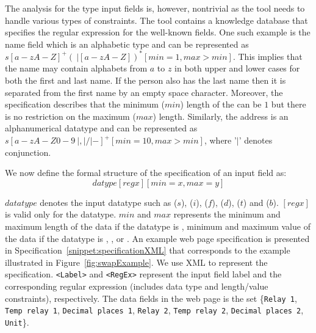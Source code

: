 The analysis for the \String type input fields is, however, nontrivial as the \tool tool needs to handle various types of \String constraints. The tool contains a knowledge database that specifies the regular expression for the well-known fields. One such example is the name field which is an alphabetic type and can be represented as $s[a-zA-Z]^+(\ |[a-zA-Z])^*[min=1, max>min]$. This implies that the name may contain alphabets from $a$ to $z$ in both upper and lower cases for both the first and last name. If the person also has the last name then it is separated from the first name by an empty space character. Moreover, the specification describes that the minimum ($min$) length of the \String can be $1$ but there is no restriction on the maximum ($max$) length. Similarly, the address is an alphanumerical \String datatype and can be represented as $s[a-zA-Z0-9\ |,|/|-]^+[min=10, max>min]$, where '$|$' denotes conjunction.

We now define the formal structure of the specification of an input field as:
$$datype[regx][min = x, max = y]$$

$datatype$ denotes the input datatype such as \String($s$), \integer($i$), \float($f$), \Date($d$), \Time($t$) and \Boolean ($b$). $[regx]$ is valid only for the \String datatype. $min$ and $max$ represents the minimum and maximum length of the data if the datatype is \String, minimum and maximum value of the data if the datatype is \integer, \float, \Date or \Time. An example web page specification is presented in Specification~\ref{snippet:specificationXML} that corresponds to the example illustrated in Figure~\ref{fig:swapExample}. We use XML to represent the specification. \texttt{<Label>} and \texttt{<RegEx>} represent the input field label and the corresponding regular expression (includes data type and length/value constraints), respectively. The data fields in the web page is the set \{\texttt{Relay 1}, \texttt{Temp relay 1}, \texttt{Decimal places 1}, \texttt{Relay 2}, \texttt{Temp relay 2}, \texttt{Decimal places 2}, \texttt{Unit}\}.


